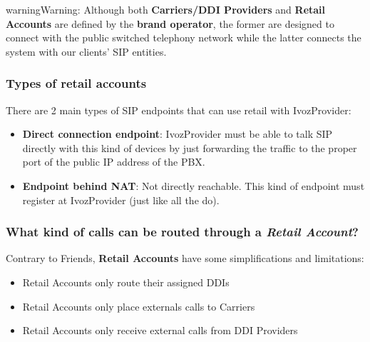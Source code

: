 \documentclass[letterpaper,10pt,english]{sphinxmanual}
\begin{document}
\begin{notice}{warning}{Warning:}
Although both \textbf{Carriers/DDI Providers} and \textbf{Retail Accounts} are defined by the
\textbf{brand operator}, the former are designed to connect with the public switched telephony network
while the latter connects the system with our clients' SIP entities.
\end{notice}


\subsubsection{Types of retail accounts}
\label{administration_portal/client/retail/retail_accounts:types-of-retail-accounts}
There are 2 main types of SIP endpoints that can use retail with IvozProvider:
\begin{itemize}
\item {} 
\textbf{Direct connection endpoint}: IvozProvider must be able to talk SIP directly with
this kind of devices by just forwarding the traffic to the proper port of
the public IP address of the PBX.

\item {} 
\textbf{Endpoint behind NAT}: Not directly reachable. This kind of endpoint must register at
IvozProvider (just like all the {\hyperref[administration_portal/client/vpbx/terminals:terminals]{}} do).

\end{itemize}


\subsubsection{What kind of calls can be routed through a \emph{Retail Account}?}
\label{administration_portal/client/retail/retail_accounts:what-kind-of-calls-can-be-routed-through-a-retail-account}
Contrary to Friends, \textbf{Retail Accounts} have some simplifications and limitations:
\begin{itemize}
\item {} 
Retail Accounts only route their assigned DDIs

\item {} 
Retail Accounts only place externals calls to Carriers

\item {} 
Retail Accounts only receive external calls from DDI Providers

\end{itemize}
\end{document}
